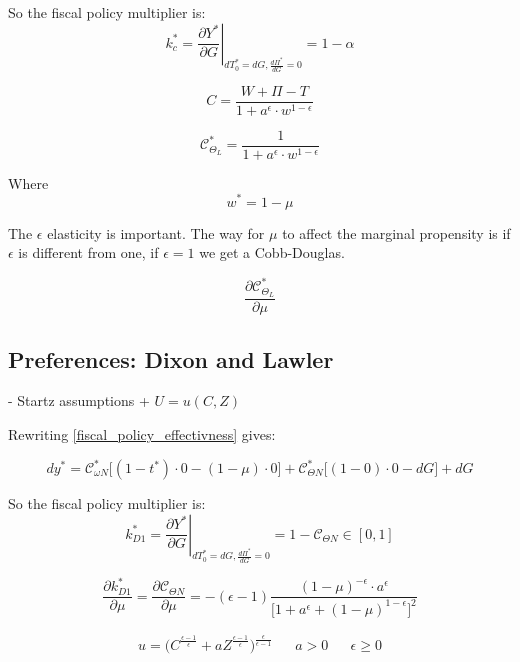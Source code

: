 So the fiscal policy multiplier is:
\begin{equation}\tag{$m^*_C$}
 \left. k^*_c = \frac{\partial Y^*}{\partial G} \right\rvert_{dT^*_0 = dG, \frac{d\Pi^*}{dG} = 0 } = 1 - \alpha
\end{equation}

$$
C = \frac{W + \Pi  - T}{1 + a^\epsilon \cdot w^{1 - \epsilon}}
$$


$$
\mathcal{C}^*_{\Theta_L} = \frac{1}{1 + a^\epsilon \cdot w^{1 - \epsilon}}
$$

Where
$$
w^* = 1 - \mu
$$

The $\epsilon$ elasticity is important. The way for $\mu$ to affect the marginal propensity is if $\epsilon$ is different from one, if $\epsilon = 1$ we get a Cobb-Douglas. 

$$
\frac{\partial \mathcal{C}^*_{\Theta_L}}{\partial \mu}
$$

\subsection{Preferences: Dixon and Lawler}

 - Startz assumptions + $U=u(C,Z)$


Rewriting \ref{fiscal_policy_effectivness} gives:

\begin{equation*}
    dy^*=\mathcal{C}_{\omega N}^*\bigg[(1-t^*)\cdot 0-(1-\mu)\cdot 0\bigg] + \mathcal{C}_{\Theta N}^*\bigg[(1-0)\cdot 0-dG\bigg]+dG
\end{equation*}


So the fiscal policy multiplier is:
\begin{equation}\tag{$m^*_D1$}
    \left. k^*_{D1} = \frac{\partial Y^*}{\partial G} \right\rvert_{dT^*_0 = dG, \frac{d\Pi^*}{dG} = 0 } = 1 - \mathcal{C}_{\Theta N} \in [0,1]
\end{equation}

\begin{equation*}
    \frac{\partial k^*_{D1}}{\partial \mu}=\frac{\partial \mathcal{C}_{\Theta N}}{\partial \mu}=-(\epsilon -1 )\frac{(1-\mu)^{-\epsilon}\cdot a^\epsilon}{\big[ 1+a^\epsilon+(1-\mu)^{1-\epsilon}\big]^2} 
\end{equation*}

\begin{align*}
    u=\big(C^{\frac{\epsilon -1 }{\epsilon}}+aZ^{\frac{\epsilon-1}{\epsilon}}\big)^{\frac{\epsilon}{\epsilon -1}} && a>0 && \epsilon \geq 0
\end{align*}

